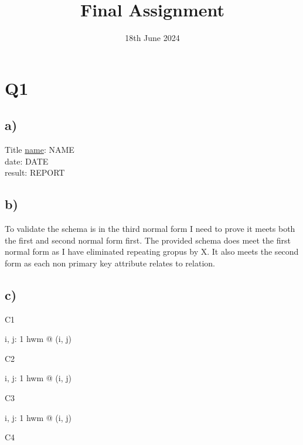 \documentclass{article}
\title{Final Assignment}
\date{\vspace{-1.0cm}18th June 2024}
\begin{document}
\maketitle

\section*{Q1}

\subsection*{\small a)}

\begin{schema}{Title}
	\underline{name}: NAME \\
	date: DATE \\
	result: REPORT
\end{schema}

\subsection*{\small b)}

To validate the schema is in the third normal form I need to prove it meets both the first and second normal form first.
\newline
\newline
The provided schema does meet the first normal form as I have eliminated repeating gropus by X.
\newline
\newline
It also meets the second form as each non primary key attribute relates to relation.

\subsection*{\small c)}

C1

\begin{zed}
\forall i, j: 1 \upto hwm @ (i, j)
\end{zed}
\newline
C2

\begin{zed}
\forall i, j: 1 \upto hwm @ (i, j)
\end{zed}
\newline
C3

\begin{zed}
\forall i, j: 1 \upto hwm @ (i, j) \\
\end{zed}
C4
\end{document}
